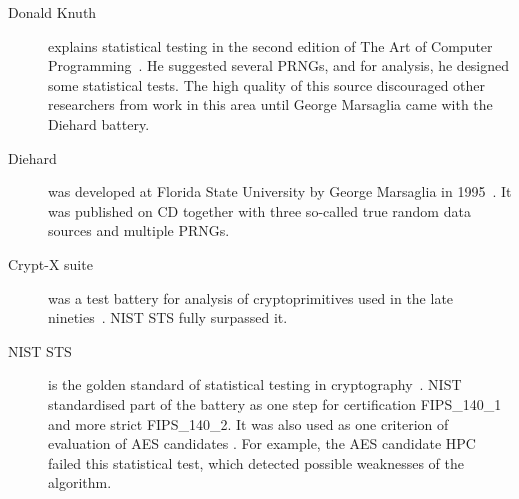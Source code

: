 \documentclass[
  print, %
  Table,   %
  nolof,     %
  nolot,     %
  11pt, %
  oneside  %
]{fithesis3}
\begin{document}

\begin{description}
    \item[Donald Knuth] explains statistical testing in the second edition of The Art of Computer Programming~\cite{knuth1969vol}. He suggested several PRNGs, and for analysis, he designed some statistical tests. The high quality of this source discouraged other researchers from work in this area until George Marsaglia came with the Diehard battery. %
    \item[Diehard] was developed at Florida State University by George Marsaglia in 1995~\cite{marsaglia1996diehard}. It was published on CD together with three so-called true random data sources and multiple PRNGs. %
    \item[Crypt-X suite] was a test battery for analysis of cryptoprimitives used in the late nineties~\cite{cryptxs}. NIST STS fully surpassed it. %
    \item[NIST STS] is the golden standard of statistical testing in cryptography~\cite{rukhin2001statistical}. NIST standardised part of the battery as one step for certification FIPS\_140\_1 and more strict FIPS\_140\_2. It was also used as one criterion of evaluation of AES candidates \cite{murphy2000power}. For example, the AES candidate HPC failed this statistical test, which detected possible weaknesses of the algorithm.


\end{description}
\end{document}
